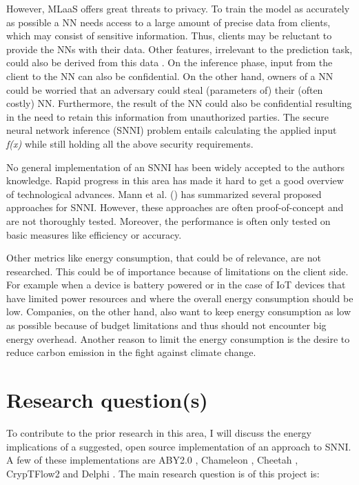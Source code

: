 \documentclass{uva-inf-article}
\begin{document}
However, MLaaS offers great threats to privacy. To train the model as accurately as possible a NN needs access to a large amount of precise data from clients, which may consist of sensitive information. Thus, clients may be reluctant to provide the NNs with their data. Other features, irrelevant to the prediction task, could also be derived from this data \parencite{Nasr2019}. On the inference phase, input from the client to the NN can also be confidential. On the other hand, owners of a NN could be worried that an adversary could steal (parameters of) their (often costly) NN. Furthermore, the result of the NN could also be confidential resulting in the need to retain this information from unauthorized parties. The secure neural network inference (SNNI) problem entails calculating the applied input \textit{f(x)} while still holding all the above security requirements. 

No general implementation of an SNNI has been widely accepted to the authors knowledge. Rapid progress in this area has made it hard to get a good overview of technological advances. Mann et al. (\citeyear{Mann22}) has summarized several proposed approaches for SNNI. However, these approaches are often proof-of-concept and are not thoroughly tested. Moreover, the performance is often only tested on basic measures like efficiency or accuracy.

Other metrics like energy consumption, that could be of relevance, are not researched. This could be of importance because of limitations on the client side. For example when a device is battery powered or in the case of IoT devices that have limited power resources and where the overall energy consumption should be low. Companies, on the other hand, also want to keep energy consumption as low as possible because of budget limitations and thus should not encounter big energy overhead. Another reason to limit the energy consumption is the desire to reduce carbon emission in the fight against climate change.

\section{Research question(s)}
To contribute to the prior research in this area, I will discuss the energy implications of a suggested, open source implementation of an approach to SNNI. A few of these implementations are ABY2.0 \parencite{ABY20}, Chameleon \parencite{Chameleon}, Cheetah \parencite{Cheetah}, CrypTFlow2 \parencite{CrypTFlow2} and Delphi \parencite{Delphi}. The main research question is of this project is:
\end{document}
